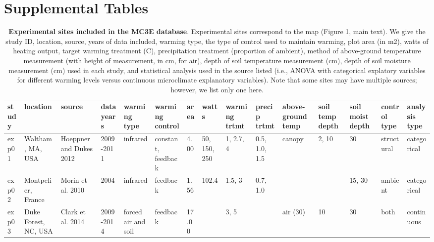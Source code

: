 \documentclass{article}
\begin{document}
\section* {Supplemental Tables} 
\begin{landscape}
\begin{footnotesize} 
\begin{table}[ht]
\centering
\caption{\textbf{Experimental sites included in the MC3E database}. Experimental sites correspond to the map (Figure 1, main text). We give the study ID, location, source, years of data included, warming type, the type of control used to maintain warming, plot area (in m2), watts of heating output, target warming treatment (\degree C), precipitation treatment (proportion of ambient), method of above-ground temperature measurement (with height of measurement, in cm, for air), depth of soil temperature measurement (cm), depth of soil moisture measurement (cm) used in each study, and statistical analysis used in the source listed (i.e., ANOVA with categorical explatory variables for different warming levels versus continuous microclimate explanatory variables). Note that some sites may have multiple sources; however, we list only one here.} 
\label{tab:methods}
\begingroup\footnotesize
\begin{tabular}{|p{}|p{}|p{}|p{}|p{}|p{}|p{}|p{}|p{}|p{}|p{}|p{}|p{}|p{}|p{}|}
  \hline
study & location & source & data years & warming type & warming control & area & watts & warming trtmt & precip trtmt & above-ground temp & soil temp depth & soil moist depth & control type & analysis type \\ 
  \hline
exp01 & Waltham, MA, USA & Hoeppner and Dukes 2012 & 2009-2011 & infrared & constant, feedback & 4.00 & 50, 150, 250 & 1, 2.7, 4 & 0.5, 1.0, 1.5 & canopy & 2, 10 & 30 & structural & categorical \\ 
   \hline
exp02 & Montpelier, France & Morin et al. 2010 & 2004 & infrared & feedback & 1.56 & 102.4 & 1.5, 3 & 0.7, 1.0 &   &   & 15, 30 & ambient & categorical \\ 
   \hline
exp03 & Duke Forest, NC, USA & Clark et al. 2014 & 2009-2014 & forced air and soil & feedback & 17.00 &  & 3, 5 &   & air (30) & 10 & 30 & both & continuous \\ 

\end{tabular}
\end{table}
\end{footnotesize}
\end{landscape}
\end{document}
